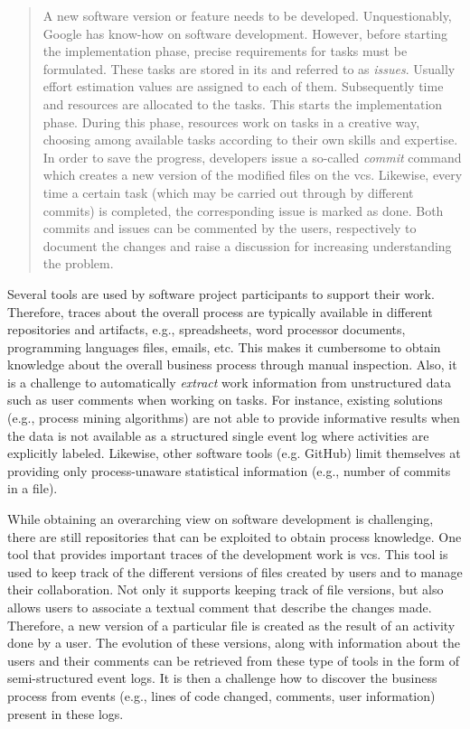 \begin{quote}
	A new software version or feature needs to be developed. Unquestionably, Google has know-how on software development. However, before starting the implementation phase, precise requirements for tasks must be formulated. These tasks are stored in \gls{its} and referred to as \emph{issues}. Usually effort estimation values are assigned to each of them. Subsequently time and resources are allocated to the tasks. This starts the implementation phase. During this phase, resources work on tasks in a creative way, choosing among available tasks according to their own skills and expertise. In order to save the progress, developers issue a so-called \emph{commit} command which creates a new version of the modified files on the \gls{vcs}. Likewise, every time a certain task (which may be carried out through by different commits) is completed, the corresponding issue is marked as done. Both commits and issues can be commented by the users, respectively to document the changes and raise a discussion for increasing understanding the problem.
\end{quote}

Several tools are used by software project participants to support their work. Therefore, traces about the overall process are typically available in different repositories and artifacts, e.g., spreadsheets, word processor documents, programming languages files, emails, etc. This makes it cumbersome to obtain knowledge about the overall business process through manual inspection. Also, it is a challenge to automatically \emph{extract} work information from unstructured data such as user comments when working on tasks. For instance, existing solutions (e.g., process mining algorithms) are not able to provide informative results when the data is not available as a structured single event log where activities are explicitly labeled. Likewise, other software tools (e.g. GitHub) limit themselves at providing only process-unaware statistical information (e.g., number of commits in a file).



While obtaining an overarching view on software development is challenging, there are still repositories that can be exploited to obtain process knowledge. One tool that provides important traces of the development work is \gls{vcs}. This tool is used to keep track of the different versions of files created by users and to manage their collaboration. Not only it supports keeping track of file versions, but also allows users to associate a textual comment that describe the changes made. Therefore, a new version of a particular file is created as the result of an activity done by a user. The evolution of these versions, along with information about the users and their comments can be retrieved from these type of tools in the form of semi-structured event logs. It is then a challenge how to discover the business process from events (e.g., lines of code changed, comments, user information) present in these logs.

